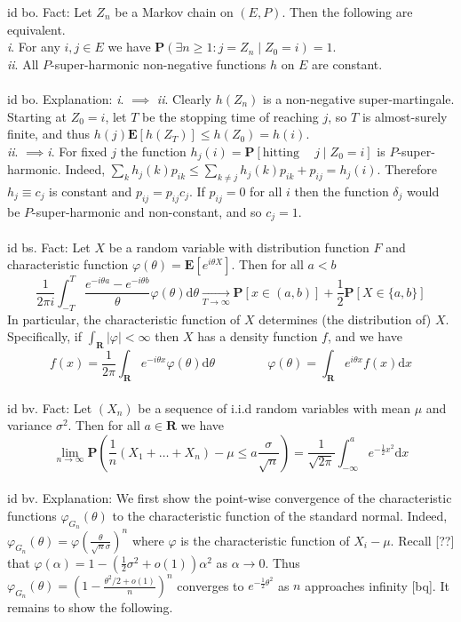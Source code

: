 \documentclass[oneside]{book}
\newcommand{\tabb}{\phantom{aaaa}}
\newcommand{\vphi}{\varphi}
\newcommand{\R}{\mathbf{R}}
\renewcommand{\P}{\mathbf{P}}
\newcommand{\E}{\mathbf{E}}
\newcommand{\set}[1]{\{ #1\}}
\newcommand{\fit}[1]{\left( #1\right)}
\renewcommand{\d}{\mathrm{d}}
\newcommand{\spc}{\phantom{-}}
\renewcommand{\i}{{\it i}. }
\newcommand{\ii}{{\it ii}. }
\newcommand{\iid}{i.i.d }
\begin{document}
id bo. Fact: Let $Z_n$ be a Markov chain on $(E,P)$. Then the following are equivalent.\\
\i For any $i,j\in E$ we have $\P\fit{\exists n\ge 1: j=Z_n\mid Z_0=i}=1$. \\
\ii All $P$-super-harmonic non-negative functions $h$ on $E$ are constant.  \\\\


id bo. Explanation: \i$\implies$ \ii Clearly $h(Z_n)$ is a non-negative super-martingale. Starting at $Z_0=i$, let $T$ be the stopping time of reaching $j$, so $T$ is almost-surely finite, and thus $h(j)\E[h(Z_T)]\le h(Z_0)=h(i)$.\\
\ii$\implies$\i For fixed $j$ the function $h_j(i)=\P[\text{hitting}\spc j\mid Z_0=i]$ is $P$-super-harmonic. Indeed, $\sum_k h_j(k)p_{ik}\le \sum_{k\neq j}h_j(k)p_{ik}+p_{ij}=h_j(i)$. Therefore $h_j\equiv c_j$ is constant and $p_{ij}=p_{ij}c_j$. If $p_{ij}=0$ for all $i$ then the function $\delta_j$ would be $P$-super-harmonic and non-constant, and so $c_j=1$. \\\\


id bs. Fact: Let $X$ be a random variable with distribution function $F$ and characteristic function $\vphi(\theta)=\E[e^{i\theta X}]$. Then for all $a<b$ $$\frac{1}{2\pi i}\int_{-T}^T\dfrac{e^{-i\theta a}-e^{-i\theta b}}{\theta}\vphi(\theta)\d \theta \underset{T\to\infty}{\longrightarrow} \P[x\in(a,b)] + \frac{1}{2}\P[X\in\set{a,b}]$$
In particular, the characteristic function of $X$ determines (the distribution of) $X$. Specifically, if $\int_\R|\vphi| < \infty$ then $X$ has a density function $f$, and we have
$$f(x)=\dfrac{1}{2\pi}\int_\R e^{-i\theta x}\vphi(\theta)\d \theta\tabb\tabb\vphi(\theta)=\int_\R e^{i\theta x}f(x)\d x$$
\\


id bv. Fact: Let $(X_n)$ be a sequence of \iid random variables with mean $\mu$ and variance $\sigma^2$. Then for all $a\in\R$ we have
$$\lim_{n\to\infty}\P\fit{\frac{1}{n}(X_1+\dots+X_n)-\mu \le a\frac{\sigma}{\sqrt{n}}}=\dfrac{1}{\sqrt{2\pi}}\int_{-\infty}^a e^{-\frac{1}{2}x^2}\d x$$
\\


id bv. Explanation: We first show the point-wise convergence of the characteristic functions $\vphi_{G_n}(\theta)$ to the characteristic function of the standard normal. Indeed, $\vphi_{G_n}(\theta)={\vphi\fit{\frac{\theta}{\sqrt{n}\sigma}}}^n$ where $\vphi$ is the characteristic function of $X_i-\mu$. Recall [??] that $\vphi(\alpha)=1-\fit{\frac{1}{2}\sigma^2+o(1)}\alpha^2$ as $\alpha\to 0$. Thus $\vphi_{G_n}(\theta)=\fit{1-{\frac{{\theta^2/2}+o(1)}{n}}}^n$ converges to $e^{-\frac{1}{2}\theta^2}$ as $n$ approaches infinity [bq]. It remains to show the following.   \\\\
\end{document}
